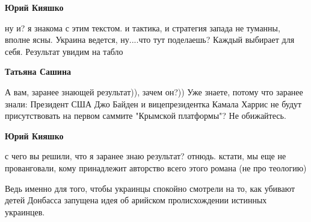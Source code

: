 \begin{itemize}
\begin{itemize}
\textbf{Юрий Кияшко} 

ну и? я знакома с этим текстом. и тактика, и стратегия запада не туманны,
вполне ясны. Украина ведется, ну....что тут поделаешь? Каждый выбирает для
себя. Результат увидим на табло


 
\textbf{Татьяна Сашина} 

А вам, заранее знающей результат)), зачем он?)) Уже знаете, потому что заранее
знали: Президент США Джо Байден и вицепрезидентка Камала Харрис не будут
присутствовать на первом саммите "Крымской платформы"? Не обижайтесь.


 
\textbf{Юрий Кияшко} 

с чего вы решили, что я заранее знаю результат? отнюдь. кстати, мы еще не
прованговали, кому принадлежит авторство всего этого романа (не про теологию)

\end{itemize}


Ведь именно для того, чтобы украинцы спокойно смотрели на то, как убивают детей
Донбасса запущена идея об арийском пролисхождении истинных украинцев.

\end{itemize}

